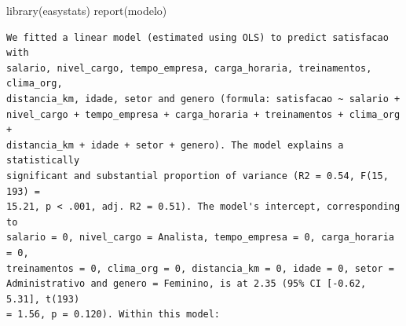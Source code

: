 \documentclass[
  letterpaper,
  DIV=11,
  numbers=noendperiod]{scrartcl}
\newenvironment{Shaded}{\begin{snugshade}}{\end{snugshade}}
\newcommand{\FunctionTok}[1]{\textcolor[rgb]{0.28,0.35,0.67}{#1}}
\newcommand{\NormalTok}[1]{\textcolor[rgb]{0.00,0.23,0.31}{#1}}
\begin{document}
\begin{Shaded}
\begin{Highlighting}[]
\FunctionTok{library}\NormalTok{(easystats)}
\FunctionTok{report}\NormalTok{(modelo)}
\end{Highlighting}
\end{Shaded}

\begin{verbatim}
We fitted a linear model (estimated using OLS) to predict satisfacao with
salario, nivel_cargo, tempo_empresa, carga_horaria, treinamentos, clima_org,
distancia_km, idade, setor and genero (formula: satisfacao ~ salario +
nivel_cargo + tempo_empresa + carga_horaria + treinamentos + clima_org +
distancia_km + idade + setor + genero). The model explains a statistically
significant and substantial proportion of variance (R2 = 0.54, F(15, 193) =
15.21, p < .001, adj. R2 = 0.51). The model's intercept, corresponding to
salario = 0, nivel_cargo = Analista, tempo_empresa = 0, carga_horaria = 0,
treinamentos = 0, clima_org = 0, distancia_km = 0, idade = 0, setor =
Administrativo and genero = Feminino, is at 2.35 (95% CI [-0.62, 5.31], t(193)
= 1.56, p = 0.120). Within this model:


\end{verbatim}
\end{document}

